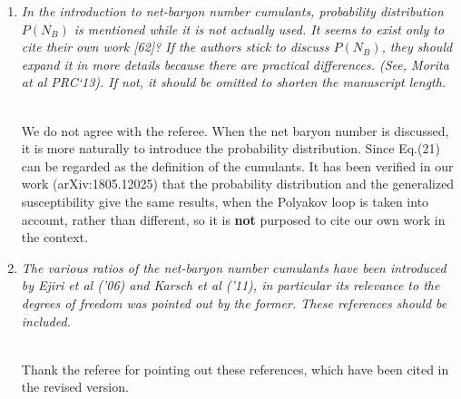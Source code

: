 \documentclass[aps,article,author-year,notitlepage,showpacs]{revtex4-1}
\begin{document}
\begin{enumerate}[1.]
\item {\it In the introduction to net-baryon number cumulants, probability distribution $P(N_B)$ is mentioned while it is not actually used. It seems to exist only to cite their own work [62]? If the authors stick to discuss $P(N_B)$, they should expand it in more details because there are practical differences. (See, Morita at al PRC`13). If not, it should be omitted to shorten the manuscript length.}\\[0.3ex] 

We do not agree with the referee. When the net baryon number is discussed, it is more naturally to introduce the probability distribution. Since Eq.(21) can be regarded as the definition of the cumulants. It has been verified in our work (arXiv:1805.12025) that the probability distribution and the generalized susceptibility give the same results, when the Polyakov loop is taken into account, rather than different, so it is {\bf not} purposed to cite our own work in the context.

\item {\it The various ratios of the net-baryon number cumulants have been introduced by Ejiri et al ('06) and Karsch et al ('11), in particular its relevance to the degrees of freedom was pointed out by the former. These references should be included.}\\[0.3ex] 

Thank the referee for pointing out these references, which have been cited in the revised version.


\end{enumerate}
\end{document}
